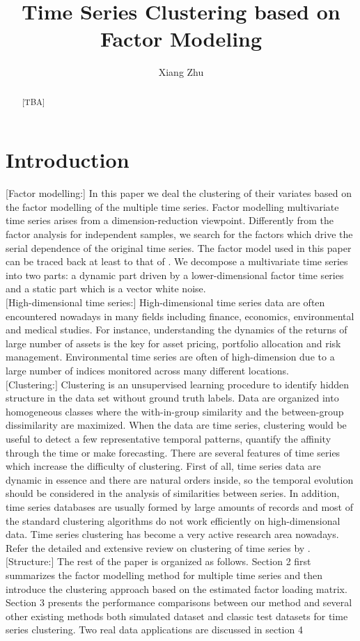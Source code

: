 \documentclass{statsoc}
\title[Time series clustering based on Factor Modeling]{Time Series Clustering based on Factor Modeling}
\author[Xiang Zhu{\it et al.}]{Xiang Zhu}
\begin{document}
\begin{abstract}
[\sf TBA]
\end{abstract}
\keywords{[\sf TBA]}
\section{Introduction}
[{\sf Factor modelling}:] In this paper we deal the clustering of their variates based on the factor modelling of the multiple time series. Factor modelling multivariate time series arises from a dimension-reduction viewpoint. Differently from the factor analysis for independent samples, we search for the factors which drive the serial dependence of the original time series. The factor model used in this paper can be traced back at least to that of \cite{pb_fm87}. We decompose a multivariate time series into two parts: a dynamic part driven by a lower-dimensional factor time series and a static part which is a vector white noise.\\
$[${\sf High-dimensional time series}:$]$ High-dimensional time series data are often encountered nowadays in many fields including  finance, economics, environmental and medical studies. For instance, understanding the dynamics of the returns of large number of assets is the key for asset pricing, portfolio allocation and risk management. Environmental time series are often of high-dimension due to a large number of indices monitored across many different locations.\\
$[${\sf Clustering}:$]$ Clustering is an unsupervised learning procedure to identify hidden structure in the data set without ground truth labels. Data are organized into homogeneous classes where the with-in-group similarity and the between-group dissimilarity are maximized. When the data are time series, clustering would be useful to detect a few representative temporal patterns, quantify the affinity through the time or make forecasting. There are several features of time series which increase the difficulty of clustering. First of all, time series data are dynamic in essence and there are natural orders inside, so the temporal evolution should be considered in the analysis of similarities between series. In addition, time series databases are usually formed by large amounts of records and most of the standard clustering algorithms do not work efficiently on high-dimensional data. Time series clustering has become a very active research area nowadays. Refer the detailed and extensive review on clustering of time series by \cite{liao}.\\
$[${\sf Structure:}$]$ The rest of the paper is organized as follows. Section 2 first summarizes the factor modelling method for multiple time series \citep{ly_fm12} and then introduce the clustering approach based on the estimated factor loading matrix. Section 3 presents the performance comparisons between our method and several other existing methods both simulated dataset and classic  test datasets for time series clustering. Two real data applications are discussed in section 4
\end{document}
